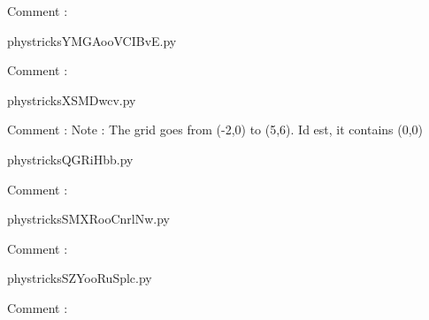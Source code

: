    Comment : 

    \clearpage
    


    \newcommand{\CaptionFigYMGAooVCIBvE}{<+Type your caption here+>}
    \begin{center}
        
    \end{center}
    phystricksYMGAooVCIBvE.py

    Comment : 

    \clearpage
    


    \newcommand{\CaptionFigXSMDwcv}{<+Type your caption here+>}
    \begin{center}
        
    \end{center}
    phystricksXSMDwcv.py

    Comment : Note : The grid goes from (-2,0) to (5,6). Id est, it contains (0,0)

    \clearpage
    


    \newcommand{\CaptionFigQGRiHbb}{<+Type your caption here+>}
    \begin{center}
        
    \end{center}
    phystricksQGRiHbb.py

    Comment : 

    \clearpage
    


    \newcommand{\CaptionFigSMXRooCnrlNw}{<+Type your caption here+>}
    \begin{center}
        
    \end{center}
    phystricksSMXRooCnrlNw.py

    Comment : 

    \clearpage
    


    \newcommand{\CaptionFigSZYooRuSplc}{<+Type your caption here+>}
    \begin{center}
        
    \end{center}
    phystricksSZYooRuSplc.py

    Comment : 

